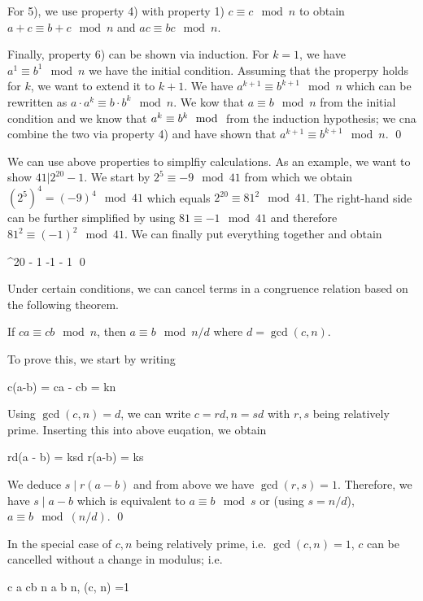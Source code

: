For 5), we use property 4) with property 1) $c \equiv c \mod n$ to obtain $a + c \equiv b + c \mod n$ and $ac \equiv bc \mod n$.

Finally, property 6) can be shown via induction. For $k = 1$, we have $a^1 \equiv b^1 \mod n$ we have the initial condition. Assuming that the properpy holds for $k$, we want to extend it to $k+1$. We have $a^{k+1} \equiv b^{k+1} \mod n$ which can be rewritten as $a \cdot a^k \equiv b \cdot b^k \mod n$. We kow that $a \equiv b \mod n$ from the initial condition and we know that $a^k \equiv b^k \mod$ from the induction hypothesis; we cna combine the two via property 4) and have shown that $a^{k+1} \equiv b^{k+1} \mod n$. \qed


We can use above properties to simplfiy calculations. As an example, we want to show $41 | 2^{20} - 1$. We start by $2^5 \equiv -9 \mod 41$ from which we obtain $(2^5)^4 = (-9)^4 \mod 41$ which equals $2^{20} \equiv 81^2 \mod 41$. The right-hand side can be further simplified by using $81 \equiv -1 \mod 41$ and therefore $81^2 \equiv (-1)^2 \mod 41$. We can finally put everything together and obtain

^{20} - 1   -1  - 1   \qed
\eee

Under certain conditions, we can cancel terms in a congruence relation based on the following theorem.

\begin{theorem}
    If $ca \equiv cb \mod n$, then $a \equiv b \mod n/d$ where $d = \gcd(c, n)$.
\end{theorem}

To prove this, we start by writing

\bee
c(a-b) = ca - cb = kn
\eee

Using $\gcd(c,n) = d$, we can write $c = rd, n = sd$ with $r, s$ being relatively prime. Inserting this into above euqation, we obtain

\bee
rd(a - b) = ksd \rightarrow r(a-b) = ks
\eee

We deduce $s \mid r(a-b)$ and from above we have $\gcd(r,s) = 1$. Therefore, we have $s \mid a-b$ which is equivalent to $a \equiv b \mod s$ or (using $s = n/d$), $a \equiv b \mod (n/d)$. \qed

In the special case of $c, n$ being relatively prime, i.e. $\gcd(c, n) = 1$, $c$ can be cancelled without a change in modulus; i.e.

\bee
c a \equiv cb \mod n \rightarrow a \equiv b \mod n, \quad {} \gcd(c, n) =1
\eee

